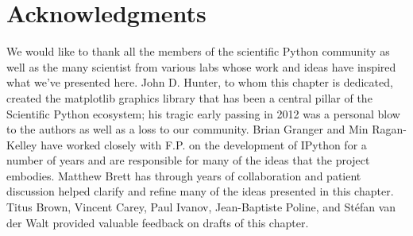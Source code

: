 \documentclass[ChapterTOCs,krantz2]{krantz} %
\begin{document}
\section*{Acknowledgments}

We would like to thank all the members of the scientific Python community as
well as the many scientist from various labs whose work and ideas have inspired
what we've presented here.  John D. Hunter, to whom this chapter is dedicated,
created the matplotlib graphics library that has been a central pillar of the
Scientific Python ecosystem; his tragic early passing in 2012 was a personal
blow to the authors as well as a loss to our community.  Brian Granger and Min
Ragan-Kelley have worked closely with F.P. on the development of IPython for a
number of years and are responsible for many of the ideas that the project
embodies.  Matthew Brett has through years of collaboration and patient
discussion helped clarify and refine many of the ideas presented in this
chapter.  Titus Brown, Vincent Carey, Paul Ivanov, Jean-Baptiste Poline, and
Stéfan van der Walt provided valuable feedback on drafts of this chapter.




\end{document}

